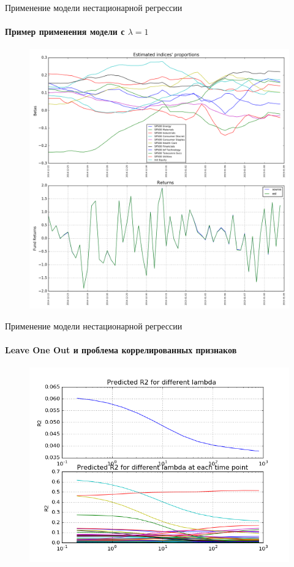 \documentclass[11pt]{beamer}
\begin{document}
\begin{frame}{Применение модели нестационарной регрессии}
\framesubtitle{Пример применения модели с $\lambda = 1$}

\begin{figure}
\centering
\includegraphics[scale=0.2]{example_nsr.png}
\end{figure}

\end{frame}

\begin{frame}{Применение модели нестационарной регрессии}
\framesubtitle{Leave One Out и проблема коррелированных признаков}

\begin{figure}
\centering
\includegraphics[scale=0.4]{loo_r2.png}
\end{figure}
\end{frame}
\end{document}
